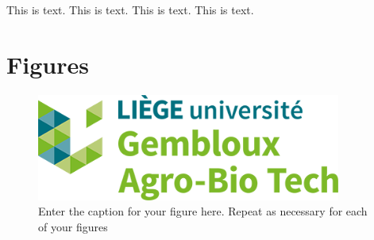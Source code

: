 \documentclass[utf8]{ReportTERRA}
\begin{document}
This is  text.
This is  text.
This is text.
This is  text.

\listofchanges

 



\section*{Figures}

\begin{figure}[h!]
\begin{center}
\includegraphics[width=10cm]{GABTlogo.png}
\end{center}
\caption{Enter the caption for your figure here.  Repeat as  necessary for each of your figures}\label{fig:1}
\end{figure}
\end{document}
